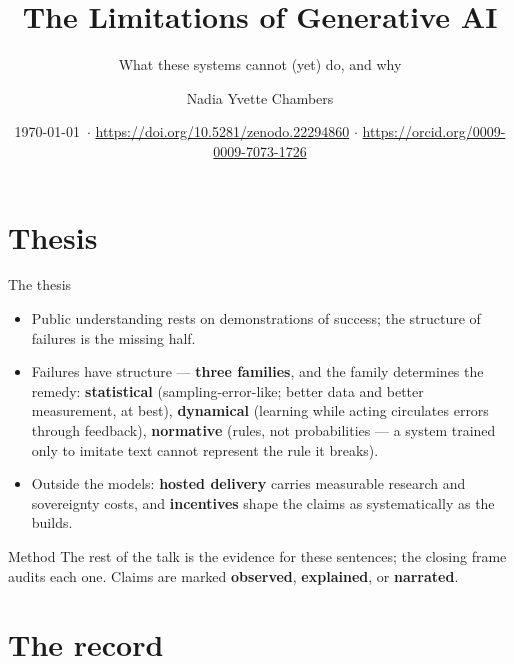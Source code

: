 \documentclass[11pt]{beamer}
\title{The Limitations of Generative AI}
\subtitle{What these systems cannot (yet) do, and why}
\author{Nadia Yvette Chambers}
\date{{\footnotesize \today\ $\cdot$ \url{https://doi.org/10.5281/zenodo.22294860} $\cdot$ \url{https://orcid.org/0009-0009-7073-1726}}}
\begin{document}
\maketitle

\section{Thesis}

\begin{frame}{The thesis}
  \small
  \begin{itemize}
    \item Public understanding rests on \alert{demonstrations of success};
          the structure of failures is the missing half.
    \item Failures have structure --- \textbf{three families}, and the
          family determines the remedy:
          \textbf{statistical} (sampling-error-like; better data and better
          measurement, at best),
          \textbf{dynamical} (learning while acting circulates errors
          through feedback),
          \textbf{normative} (rules, not probabilities --- a system trained
          only to imitate text cannot represent the rule it breaks).
    \item Outside the models: \textbf{hosted delivery} carries measurable
          research and sovereignty costs, and \textbf{incentives} shape the
          claims as systematically as the builds.
  \end{itemize}
  \begin{block}{Method}
    The rest of the talk is the evidence for these sentences; the closing
    frame audits each one. Claims are marked \textbf{observed},
    \textbf{explained}, or \textbf{narrated}.
  \end{block}
\end{frame}

\section{The record}
\end{document}
